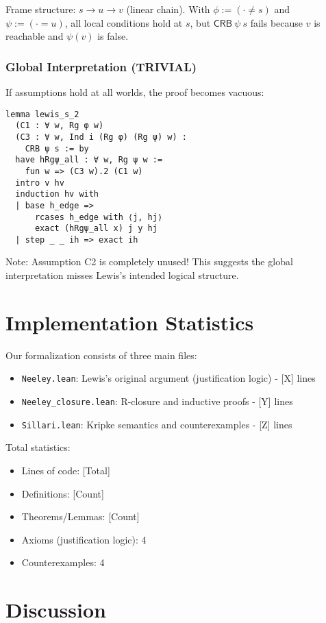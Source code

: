 \documentclass[11pt]{article}
\newcommand{\CRB}{\mathsf{CRB}}
\begin{document}
Frame structure: $s \to u \to v$ (linear chain). With $\phi := (\cdot \neq s)$ 
and $\psi := (\cdot = u)$, all local conditions hold at $s$, but $\CRB\ \psi\ s$ 
fails because $v$ is reachable and $\psi(v)$ is false.

\subsubsection{Global Interpretation (TRIVIAL)}

If assumptions hold at all worlds, the proof becomes vacuous:

\begin{verbatim}
lemma lewis_s_2
  (C1 : ∀ w, Rg φ w)
  (C3 : ∀ w, Ind i (Rg φ) (Rg ψ) w) :
    CRB ψ s := by
  have hRgψ_all : ∀ w, Rg ψ w := 
    fun w => (C3 w).2 (C1 w)
  intro v hv
  induction hv with
  | base h_edge =>
      rcases h_edge with ⟨j, hj⟩
      exact (hRgψ_all x) j y hj
  | step _ _ ih => exact ih
\end{verbatim}

Note: Assumption C2 is completely unused! This suggests the global interpretation 
misses Lewis's intended logical structure.

\section{Implementation Statistics}

Our formalization consists of three main files:

\begin{itemize}
\item \texttt{Neeley.lean}: Lewis's original argument (justification logic) - [X] lines
\item \texttt{Neeley\_closure.lean}: R-closure and inductive proofs - [Y] lines  
\item \texttt{Sillari.lean}: Kripke semantics and counterexamples - [Z] lines
\end{itemize}

Total statistics:
\begin{itemize}
\item Lines of code: [Total]
\item Definitions: [Count]
\item Theorems/Lemmas: [Count]
\item Axioms (justification logic): 4
\item Counterexamples: 4
\end{itemize}

\section{Discussion}
\end{document}
